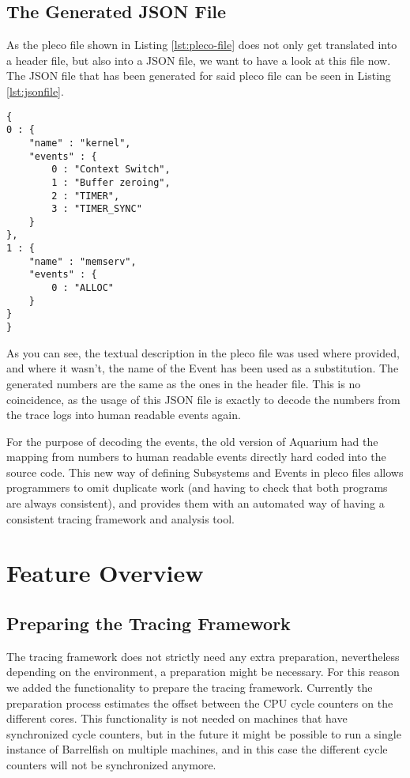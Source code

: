 \documentclass[a4paper,11pt,twoside]{report}
\begin{document}
\subsection{The Generated JSON File}

As the pleco file shown in Listing  \ref{lst:pleco-file} does not only get
translated into a header file, but also into a JSON file, we want to have a look
at this file now. The JSON file that has been generated for said pleco file can
be seen in Listing \ref{lst:jsonfile}.

\begin{code}
\begin{lstlisting}[frame=single, caption={A JSON file that has been generated
	based on the pleco file shown in Listing \ref{lst:pleco-file}. This file can
be used by Aquarium to decode log traces.}, label={lst:jsonfile}]
{
0 : {
    "name" : "kernel",
    "events" : {
        0 : "Context Switch",
        1 : "Buffer zeroing",
        2 : "TIMER",
        3 : "TIMER_SYNC"
    }
},
1 : {
    "name" : "memserv",
    "events" : {
        0 : "ALLOC"
    }
}
}
\end{lstlisting}
\end{code}

As you can see, the textual description in the pleco file was used where
provided, and where it wasn't, the name of the Event has been used as a
substitution. The generated numbers are the same as the ones in the header file.
This is no coincidence, as the usage of this JSON file is exactly to decode the
numbers from the trace logs into human readable events again.

For the purpose of decoding the events, the old version of Aquarium had the
mapping from numbers to human readable events directly hard coded into the
source code. This new way of defining Subsystems and Events in pleco files
allows programmers to omit duplicate work (and having to check that both programs
are always consistent), and provides them with an automated way of having a
consistent tracing framework and analysis tool.

\section{Feature Overview}
\subsection{Preparing the Tracing Framework\label{sec:preparing}}

The tracing framework does not strictly need any extra preparation, nevertheless
depending on the environment, a preparation might be necessary. For this reason
we added the functionality to prepare the tracing framework. Currently the
preparation process estimates the offset between the CPU cycle counters on the
different cores. This functionality is not needed on machines that have
synchronized cycle counters, but in the future it might be possible to run a
single instance of Barrelfish on multiple machines, and in this case the
different cycle counters will not be synchronized anymore.
\end{document}
